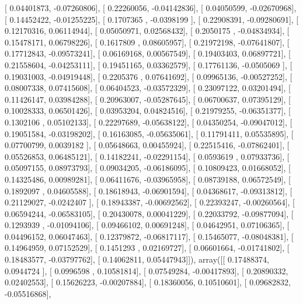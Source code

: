 \documentclass{article}
\begin{document}
       [ 0.04401873, -0.07260806],
       [ 0.22260056, -0.04142836],
       [ 0.04050599, -0.02670968],
       [ 0.14452422, -0.01255225],
       [ 0.1707365 , -0.0398199 ],
       [ 0.22908391, -0.09280691],
       [ 0.12170316,  0.06114944],
       [ 0.05050971,  0.02568432],
       [ 0.2050175 , -0.04834934],
       [ 0.15478171,  0.06798226],
       [ 0.1617809 ,  0.08605957],
       [ 0.21972198, -0.07641807],
       [ 0.17712843, -0.09573241],
       [ 0.06169168,  0.00567549],
       [ 0.19403403,  0.06897721],
       [ 0.21558604, -0.04253111],
       [ 0.19451165,  0.03362579],
       [ 0.17761136, -0.0505069 ],
       [ 0.19031003, -0.04919448],
       [ 0.2205376 ,  0.07641692],
       [ 0.09965136, -0.00527252],
       [ 0.08007338,  0.07415608],
       [ 0.06404523, -0.03572329],
       [ 0.23097122,  0.03201494],
       [ 0.11426147,  0.03984288],
       [ 0.20963007, -0.05287645],
       [ 0.06700637,  0.07395129],
       [ 0.10028333,  0.06501426],
       [ 0.03953204,  0.04824516],
       [ 0.21979255, -0.06351377],
       [ 0.1302106 ,  0.05102133],
       [ 0.22297689, -0.05638122],
       [ 0.04350254, -0.09047012],
       [ 0.19051584, -0.03198202],
       [ 0.16163085, -0.05635061],
       [ 0.11791411,  0.05535895],
       [ 0.07700799,  0.0039182 ],
       [ 0.05648663,  0.00455924],
       [ 0.22515416, -0.07862401],
       [ 0.05526853,  0.06485121],
       [ 0.14182241, -0.02291154],
       [ 0.0593619 ,  0.07933736],
       [ 0.05097155,  0.08973793],
       [ 0.09034205, -0.06186095],
       [ 0.10809423,  0.01668052],
       [ 0.14325486,  0.00989281],
       [ 0.06411676, -0.03965958],
       [ 0.08739188,  0.06572549],
       [ 0.1892097 ,  0.04605588],
       [ 0.18618943, -0.06901594],
       [ 0.04368617, -0.09313812],
       [ 0.21129027, -0.0242407 ],
       [ 0.18943387, -0.00692562],
       [ 0.22393247, -0.00260564],
       [ 0.06594244, -0.06583105],
       [ 0.20430078,  0.00041229],
       [ 0.22033792, -0.09877094],
       [ 0.1293939 , -0.01094106],
       [ 0.09466102,  0.00691248],
       [ 0.04642951,  0.07106365],
       [ 0.04496152,  0.06047463],
       [ 0.12379872, -0.06817117],
       [ 0.15465077, -0.08048381],
       [ 0.14964959,  0.07152529],
       [ 0.1451293 ,  0.02169727],
       [ 0.06601664, -0.01741802],
       [ 0.18483577, -0.03797762],
       [ 0.14062811,  0.05447943]]), array([[ 0.17488374,  0.0944724 ],
       [ 0.0996598 ,  0.10581814],
       [ 0.07549284, -0.00417893],
       [ 0.20890332,  0.02402553],
       [ 0.15626223, -0.00207884],
       [ 0.18360056,  0.10510601],
       [ 0.09682832, -0.05516868],
\end{document}
